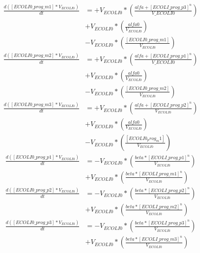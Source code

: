 \documentclass[12pt]{article}
\begin{document}
    \begin{equation*}
    \begin{split}
        \frac{d([ECOLI0\_prog\_m1]*V_{ECOLI0})}{dt} & = +V_{ECOLI0}*(\frac{alfa + [ECOLI\_prog\_p3]^n}{V\_{ECOLI0}}) \\ & +V_{ECOLI0}*(\frac{alfa0}{V_{ECOLI0}})
        \\ & -V_{ECOLI0}*(\frac{[ECOLI0\_prog\_m1]}{V_{ECOLI0}})
    \end{split}
    \end{equation*}
    \begin{equation*}
    \begin{split}
        \frac{d([ECOLI0\_prog\_m2]*V_{ECOLI0})}{dt} & = +V_{ECOLI0}*(\frac{alfa + [ECOLI\_prog\_p1]^n}{V\_{ECOLI0}}) \\ & +V_{ECOLI0}*(\frac{alfa0}{V_{ECOLI0}})
        \\ & -V_{ECOLI0}*(\frac{[ECOLI0\_prog\_m2]}{V_{ECOLI0}})
    \end{split}
    \end{equation*}
    \begin{equation*}
    \begin{split}
        \frac{d([ECOLI0\_prog\_m3]*V_{ECOLI0})}{dt} & = +V_{ECOLI0}*(\frac{alfa + [ECOLI\_prog\_p2]^n}{V_{ECOLI0}})
        \\ & +V_{ECOLI0}*(\frac{alfa0}{V_{ECOLI0}})
        \\ & -V_{ECOLI0}*(\frac{[ECOLI0_prog_m1]}{V_{ECOLI0}})
    \end{split}
    \end{equation*}
    \begin{equation*}
    \begin{split}
        \frac{d([ECOLI0\_prog\_p1]*V_{ECOLI0})}{dt} & = -V_{ECOLI0}*(\frac{beta*[ECOLI\_prog\_p1]^n}{V_{ECOLI0}}) 
        \\ & +V_{ECOLI0}*(\frac{beta*[ECOLI\_prog\_m1]^n}{V_{ECOLI0}})
    \end{split}
    \end{equation*}
    \begin{equation*}
    \begin{split}
        \frac{d([ECOLI0\_prog\_p2]*V_{ECOLI0})}{dt} & = -V_{ECOLI0}*(\frac{beta*[ECOLI\_prog\_p2]^n}{V_{ECOLI0}}) 
        \\ & +V_{ECOLI0}*(\frac{beta*[ECOLI\_prog\_m2]^n}{V_{ECOLI0}})
    \end{split}
    \end{equation*}
    \begin{equation*}
    \begin{split}
        \frac{d([ECOLI0\_prog\_p3]*V_{ECOLI0})}{dt} & = -V_{ECOLI0}*(\frac{beta*[ECOLI\_prog\_p3]^n}{V_{ECOLI0}}) 
        \\ & +V_{ECOLI0}*(\frac{beta*[ECOLI\_prog\_m3]^n}{V_{ECOLI0}})
    \end{split}
    \end{equation*}
\end{document}
